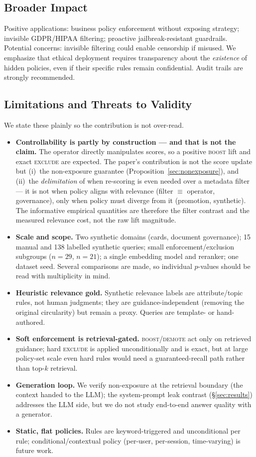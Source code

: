 \documentclass[11pt]{article}
\begin{document}
\subsection{Broader Impact}
Positive applications: business policy enforcement without exposing strategy; invisible
GDPR/HIPAA filtering; proactive jailbreak-resistant guardrails. Potential concerns: invisible
filtering could enable censorship if misused. We emphasize that ethical deployment requires
transparency about the \emph{existence} of hidden policies, even if their specific rules
remain confidential. Audit trails are strongly recommended.

\subsection{Limitations and Threats to Validity}
We state these plainly so the contribution is not over-read.
\begin{itemize}[leftmargin=1.4em,itemsep=1pt]
  \item \textbf{Controllability is partly by construction --- and that is not the claim.} The
  operator directly manipulates scores, so a positive \textsc{boost} lift and exact
  \textsc{exclude} are expected. The paper's contribution is not the score update but
  (i)~the non-exposure guarantee (Proposition~\ref{sec:nonexposure}), and (ii)~the
  \emph{delimitation} of when re-scoring is even needed over a metadata filter --- it is not
  when policy aligns with relevance (filter $\equiv$ operator, governance), only when policy must
  diverge from it (promotion, synthetic). The informative empirical quantities are therefore the
  filter contrast and the measured relevance cost, not the raw lift magnitude.
  \item \textbf{Scale and scope.} Two synthetic domains (cards, document governance); 15
  manual and 138 labelled synthetic queries; small enforcement/exclusion subgroups
  ($n{=}29$, $n{=}21$); a single embedding model and reranker; one dataset seed. Several
  comparisons are made, so individual $p$-values should be read with multiplicity in mind.
  \item \textbf{Heuristic relevance gold.} Synthetic relevance labels are attribute/topic
  rules, not human judgments; they are guidance-independent (removing the original circularity)
  but remain a proxy. Queries are template- or hand-authored.
  \item \textbf{Soft enforcement is retrieval-gated.} \textsc{boost}/\textsc{demote} act only
  on retrieved guidance; hard \textsc{exclude} is applied unconditionally and is exact, but at
  large policy-set scale even hard rules would need a guaranteed-recall path rather than top-$k$
  retrieval.
  \item \textbf{Generation loop.} We verify non-exposure at the retrieval boundary (the context
  handed to the LLM); the system-prompt leak contrast (\S\ref{sec:results}) addresses the LLM
  side, but we do not study end-to-end answer quality with a generator.
  \item \textbf{Static, flat policies.} Rules are keyword-triggered and unconditional per rule;
  conditional/contextual policy (per-user, per-session, time-varying) is future work.
\end{itemize}
\end{document}

